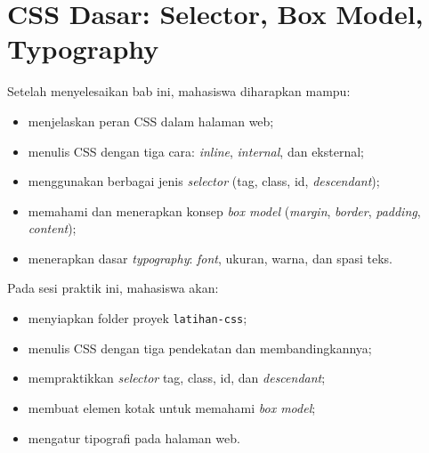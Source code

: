 
\chapter{CSS Dasar: Selector, Box Model, Typography}
\label{chap:css-dasar}

\begin{capaian}
Setelah menyelesaikan bab ini, mahasiswa diharapkan mampu:
\begin{itemize}
  \item menjelaskan peran CSS dalam halaman web;
  \item menulis CSS dengan tiga cara: \emph{inline}, \emph{internal}, dan eksternal;
  \item menggunakan berbagai jenis \emph{selector} (tag, class, id, \emph{descendant});
  \item memahami dan menerapkan konsep \emph{box model} (\emph{margin}, \emph{border}, \emph{padding}, \emph{content});
  \item menerapkan dasar \emph{typography}: \emph{font}, ukuran, warna, dan spasi teks.
\end{itemize}
\end{capaian}

\begin{tujuanpraktik}
Pada sesi praktik ini, mahasiswa akan:
\begin{itemize}
  \item menyiapkan folder proyek \texttt{latihan-css};
  \item menulis CSS dengan tiga pendekatan dan membandingkannya;
  \item mempraktikkan \emph{selector} tag, class, id, dan \emph{descendant};
  \item membuat elemen kotak untuk memahami \emph{box model};
  \item mengatur tipografi pada halaman web.
\end{itemize}
\end{tujuanpraktik}

